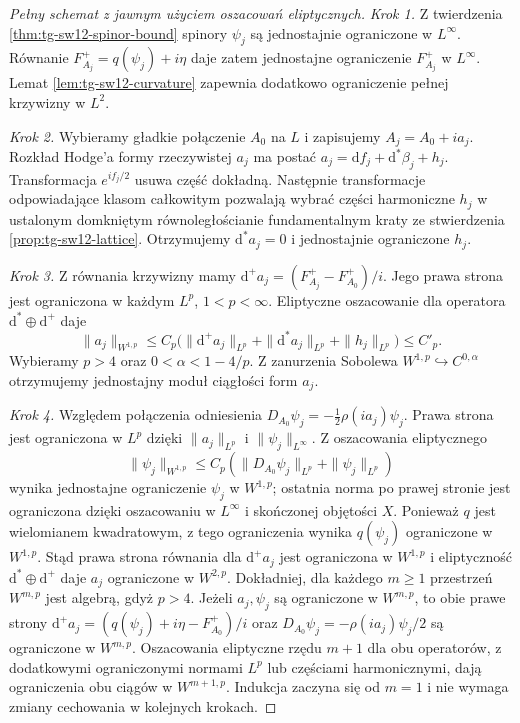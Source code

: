 \begin{proof}[Pełny schemat z jawnym użyciem oszacowań eliptycznych]
\emph{Krok 1.} Z twierdzenia \ref{thm:tg-sw12-spinor-bound}
spinory $\psi_j$ są jednostajnie ograniczone w $L^\infty$.
Równanie $F_{A_j}^+=q(\psi_j)+i\eta$ daje zatem
jednostajne ograniczenie $F_{A_j}^+$ w $L^\infty$.
Lemat \ref{lem:tg-sw12-curvature} zapewnia dodatkowo
ograniczenie pełnej krzywizny w $L^2$.

\emph{Krok 2.} Wybieramy gładkie połączenie $A_0$ na $L$
i zapisujemy $A_j=A_0+i a_j$.
Rozkład Hodge'a formy rzeczywistej $a_j$ ma postać
$a_j=\mathrm df_j+\mathrm d^*\beta_j+h_j$.
Transformacja $e^{if_j/2}$ usuwa część dokładną.
Następnie transformacje odpowiadające klasom całkowitym
pozwalają wybrać części harmoniczne $h_j$ w ustalonym
domkniętym równoległościanie fundamentalnym kraty ze
stwierdzenia \ref{prop:tg-sw12-lattice}. Otrzymujemy
$\mathrm d^*a_j=0$ i jednostajnie ograniczone $h_j$.

\emph{Krok 3.} Z równania krzywizny mamy
$\mathrm d^+a_j=(F_{A_j}^+-F_{A_0}^+)/i$.
Jego prawa strona jest ograniczona w każdym $L^p$,
$1<p<\infty$. Eliptyczne oszacowanie dla operatora
$\mathrm d^*\oplus\mathrm d^+$ daje
\[
\|a_j\|_{W^{1,p}}\le C_p
\bigl(\|\mathrm d^+a_j\|_{L^p}
+\|\mathrm d^*a_j\|_{L^p}+\|h_j\|_{L^p}\bigr)\le C'_p.
\]
Wybieramy $p>4$ oraz $0<\alpha<1-4/p$.
Z zanurzenia Sobolewa
$W^{1,p}\hookrightarrow C^{0,\alpha}$ otrzymujemy
jednostajny moduł ciągłości form $a_j$.

\emph{Krok 4.} Względem połączenia odniesienia
$D_{A_0}\psi_j=-\tfrac12\rho(i a_j)\psi_j$.
Prawa strona jest ograniczona w $L^p$ dzięki
$\|a_j\|_{L^p}$ i $\|\psi_j\|_{L^\infty}$.
Z oszacowania eliptycznego
\[
\|\psi_j\|_{W^{1,p}}\leq C_p
(\|D_{A_0}\psi_j\|_{L^p}+\|\psi_j\|_{L^p})
\]
wynika jednostajne ograniczenie $\psi_j$ w $W^{1,p}$;
ostatnia norma po prawej stronie jest ograniczona
dzięki oszacowaniu w $L^\infty$ i skończonej objętości $X$.
Ponieważ $q$ jest wielomianem kwadratowym, z tego
ograniczenia wynika $q(\psi_j)$ ograniczone w $W^{1,p}$.
Stąd prawa strona równania dla $\mathrm d^+a_j$ jest
ograniczona w $W^{1,p}$ i eliptyczność
$\mathrm d^*\oplus\mathrm d^+$ daje $a_j$ ograniczone w
$W^{2,p}$. Dokładniej, dla każdego $m\geq1$ przestrzeń $W^{m,p}$
jest algebrą, gdyż $p>4$. Jeżeli $a_j,\psi_j$
są ograniczone w $W^{m,p}$, to obie prawe strony
$\mathrm d^+a_j=(q(\psi_j)+i\eta-F_{A_0}^+)/i$
oraz $D_{A_0}\psi_j=-\rho(ia_j)\psi_j/2$
są ograniczone w $W^{m,p}$.
Oszacowania eliptyczne rzędu $m+1$ dla obu
operatorów, z dodatkowymi ograniczonymi normami
$L^p$ lub częściami harmonicznymi, dają
ograniczenia obu ciągów w $W^{m+1,p}$.
Indukcja zaczyna się od $m=1$ i nie wymaga
zmiany cechowania w kolejnych krokach.


\end{proof}
